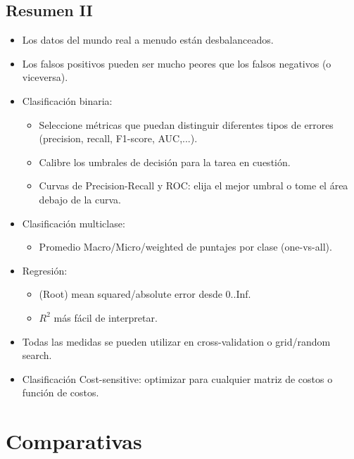 \documentclass[a4paper, 11pt]{article}
\begin{document}
\subsection{Resumen II}
\begin{itemize}
    \item Los datos del mundo real a menudo están desbalanceados.
    \item Los falsos positivos pueden ser mucho peores que los falsos negativos (o viceversa).
    \item Clasificación binaria:
    \begin{itemize}
        \item Seleccione métricas que puedan distinguir diferentes tipos de errores (precision, recall, F1-score, AUC,...).
        \item Calibre los umbrales de decisión para la tarea en cuestión.
        \item Curvas de Precision-Recall y ROC: elija el mejor umbral o tome el área debajo de la curva.
    \end{itemize}
    \item Clasificación multiclase:
    \begin{itemize}
        \item Promedio Macro/Micro/weighted de puntajes por clase (one-vs-all).
    \end{itemize}
    \item Regresión:
    \begin{itemize}
        \item (Root) mean squared/absolute error desde 0..Inf.
        \item $R^2$ más fácil de interpretar.
    \end{itemize}
    \item Todas las medidas se pueden utilizar en cross-validation o grid/random search.
    \item Clasificación Cost-sensitive: optimizar para cualquier matriz de costos o función de costos.
\end{itemize}
\newpage

\section{Comparativas}
\end{document}
